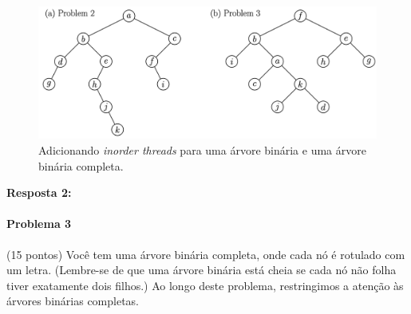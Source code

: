\documentclass{article}
\begin{document}
\begin{figure}[!h]
  \centering
    \includegraphics[width=.6\textwidth]{figures/fig2.png}
    \caption{Adicionando \textit{inorder threads} para uma árvore binária e uma árvore binária completa.}
  \label{fig:fig2}
\end{figure}



\textbf{Resposta 2:}
 
\paragraph{Problema 3} (15 pontos) Você tem uma árvore binária completa, onde cada nó é rotulado com um letra. (Lembre-se de que uma árvore binária está cheia se cada nó não folha tiver exatamente dois filhos.) Ao longo deste problema, restringimos a atenção às árvores binárias completas.
\end{document}
